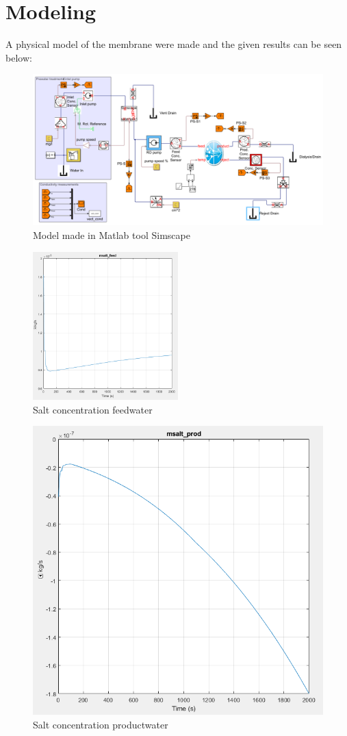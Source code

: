 \section{Modeling}
A physical model of the membrane were made and the given results can be seen below:

\begin{figure}[h]
\centering
\includegraphics[width=\textwidth]{simscape_fc1.PNG}
\caption{Model made in Matlab tool Simscape}
\label{fig:simscape}
\end{figure}
\begin{figure}[h]
\centering
    \includegraphics[width=0.5\textwidth]{msalt_feed.PNG}
    \caption{Salt concentration feedwater}
    \label{fig:msaltf}
\end{figure}
\begin{figure}[h]
\centering
  \includegraphics[width=0.5\linewidth]{msalt_prod.PNG}
  \caption{Salt concentration productwater}
  \label{fig:msalp}
\end{figure}

